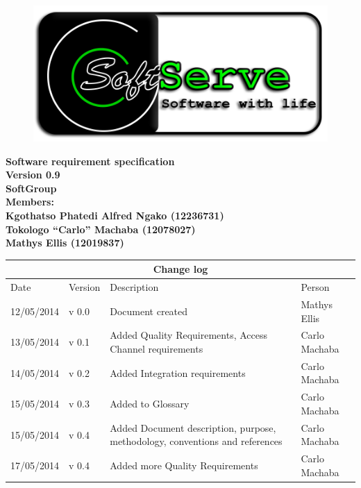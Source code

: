 \documentclass[12pt]{article}
\newcommand{\Title}{Software requirement specification} %
\newcommand{\ssr}{Soft\color{green}{Serve }\color{black}}
\begin{document}
\vspace{4em}

\begin{center}%

\begin{figure}[ht!]
\centering
\includegraphics{../Images_Docs/logo.png}
\end{figure}
\LARGE \bf \Title \\
{\bf Version 0.9}\\[4em]
\LARGE {\bf \ssr Group }\\[1em]
\LARGE {\bf Members:}\\[2em]
\large
Kgothatso Phatedi Alfred Ngako (12236731) \\[1em]
Tokologo “Carlo” Machaba (12078027) \\[1em]
Mathys Ellis (12019837) \\[8em]

\end{center}%


\begin{center}
\begin{tabular}{|l|p{1.4cm}|p{8cm}|p{2.8cm}|}
\hline
\multicolumn{4}{|c|}{\bf Change log} \\
\hline
 Date & Version & Description &  Person \\
\hline
12/05/2014 & v 0.0 & Document created & Mathys Ellis \\
\hline
13/05/2014 & v 0.1 & Added Quality Requirements, Access Channel requirements & Carlo Machaba \\
\hline
14/05/2014 & v 0.2 & Added Integration requirements & Carlo Machaba\\
\hline
15/05/2014 & v 0.3 & Added to Glossary & Carlo Machaba \\
\hline
15/05/2014 & v 0.4 & Added Document description, purpose, methodology, conventions and references & Carlo Machaba \\
\hline
17/05/2014 & v 0.4 & Added more Quality Requirements & Carlo Machaba \\
\hline
\end{tabular}
\end{center}
\newpage
\tableofcontents
\end{document}
